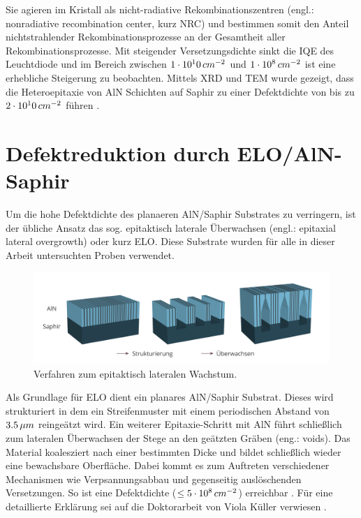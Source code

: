 \noindent
%
Sie agieren im Kristall als nicht-radiative Rekombinationszentren (engl.: nonradiative recombination center, kurz NRC) und bestimmen somit den Anteil nichtstrahlender Rekombinationsprozesse an der Gesamtheit aller Rekombinationsprozesse. Mit steigender Versetzungsdichte sinkt die IQE des Leuchtdiode und im Bereich zwischen $1\cdot 10^10 \thinspace cm^{-2}$ und $1\cdot 10^8 \thinspace cm^{-2}$ ist eine erhebliche Steigerung zu beobachten. Mittels XRD und TEM wurde gezeigt, dass die Heteroepitaxie von AlN Schichten auf Saphir zu einer Defektdichte von bis zu $2\cdot 10^10 \thinspace cm^{-2}$ führen \cite{zeimeru}.

\section{Defektreduktion durch ELO/AlN-Saphir}

Um die hohe Defektdichte des planaeren AlN/Saphir Substrates zu verringern, ist der übliche Ansatz das sog. epitaktisch laterale Überwachsen (engl.: epitaxial lateral overgrowth) oder kurz ELO. Diese Substrate wurden für alle in dieser Arbeit untersuchten Proben verwendet. 
\begin{figure}[h]
    \centering
    \begin{minipage}[t]{1\linewidth}
    \centering
    \includegraphics[width=1\linewidth]{Bilder/elostrukturierung.png}
    \end{minipage}%
    \caption{Verfahren zum epitaktisch lateralen Wachstum.}
     \label{fig:IQEthreadingdisl}
    \end{figure}
    \noindent
Als Grundlage für ELO dient ein planares AlN/Saphir Substrat. Dieses wird strukturiert in dem ein Streifenmuster mit einem periodischen Abstand von $3.5 \thinspace \mu m$ reingeätzt wird. Ein weiterer Epitaxie-Schritt mit AlN führt schließlich zum lateralen Überwachsen der Stege an den geätzten Gräben (eng.: voids).
Das Material koalesziert nach einer bestimmten Dicke und bildet schließlich wieder eine bewachsbare Oberfläche. Dabei kommt es zum Auftreten verschiedener Mechanismen wie Verpsannungsabbau und gegenseitig auslöschenden Versetzungen. So ist eine Defektdichte ($\leq 5 \cdot 10^8 \thinspace cm^{-2}$) erreichbar \cite{zeimeru} \cite{MOGILATENKO2014222} \cite{vkueller} \cite{IMURA2007257}. Für eine detaillierte Erklärung sei auf die Doktorarbeit von Viola Küller verwiesen \cite{vkueller}.